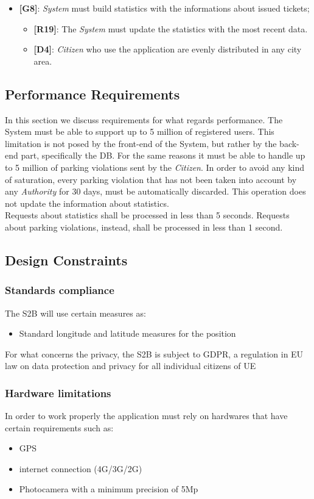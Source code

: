 \documentclass{article}
\begin{document}
\begin{itemize}
    \item \textbf{[G8]}: \textit{System} must build statistics with the informations about issued tickets;
    \begin{itemize}
        \item \textbf{[R19]}: The \textit{System} must update the statistics with the most recent data.
        \item \textbf{[D4]}: \textit{Citizen} who use the application are evenly distributed in any city area.
    \end{itemize}
\end{itemize}

\subsection{Performance Requirements}
In this section we discuss requirements for what regards performance. The System must be able to support up to
5 million of registered users. This limitation is not posed by the front-end of the System, but rather by the 
back-end part, specifically the DB. For the same reasons it must be able to handle up to 5 million of parking violations 
sent by the \textit{Citizen}. In order to avoid any kind of saturation, every parking violation that has not been taken into account
by any \textit{Authority} for 30 days, must be automatically discarded. This operation does not update the information about 
statistics.
 \\Requests about statistics shall be processed in less than 5 seconds. Requests about parking violations, instead, shall be processed 
 in less than 1 second.     

\subsection{Design Constraints}
\subsubsection{Standards compliance}
The S2B  will use certain measures as:
\begin{itemize}
    \item Standard longitude and latitude measures for the position
\end{itemize}
For what concerns the privacy, the S2B is subject to GDPR, a regulation in EU law on data protection 
and privacy for all individual citizens of UE  

\subsubsection{Hardware limitations}
In order to work properly the application must rely on hardwares that have certain requirements 
such as:
\begin{itemize}
    \item GPS
    \item internet connection (4G/3G/2G)
    \item Photocamera with a minimum precision of 5Mp 
\end{itemize}   
\end{document}
